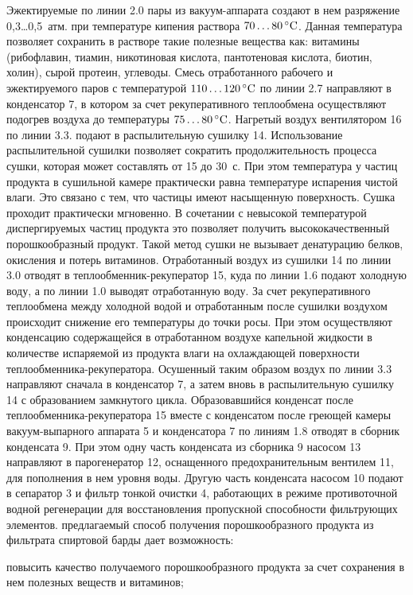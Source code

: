 Эжектируемые по линии 2.0 пары из вакуум-аппарата создают в нем разряжение 0,3\dots0,5~атм. при температуре кипения раствора $70\dots80\,^{\circ}\mathrm{C}$. 
Данная температура позволяет сохранить в растворе такие полезные вещества как: витамины (рибофлавин, тиамин, никотиновая кислота, пантотеновая кислота, биотин, холин), сырой протеин, углеводы. 
Смесь отработанного рабочего и эжектируемого паров с температурой $110\dots120\,^{\circ}\mathrm{C}$ по линии 2.7 направляют в конденсатор 7, в котором за счет рекуперативного теплообмена осуществляют подогрев воздуха до температуры $75\dots80\,^{\circ}\mathrm{C}$. Нагретый воздух вентилятором 16 по линии 3.3. подают в распылительную сушилку 14. 
Использование распылительной сушилки позволяет сократить продолжительность процесса сушки, которая может составлять от 15 до 30~с. 
При этом температура у частиц продукта в сушильной камере практически равна температуре испарения чистой влаги. 
Это связано с тем, что частицы имеют насыщенную поверхность. 
Сушка проходит практически мгновенно. 
В сочетании с невысокой температурой диспергируемых частиц продукта это позволяет получить высококачественный порошкообразный продукт. 
Такой метод сушки не вызывает денатурацию белков, окисления и потерь витаминов. 
Отработанный воздух из сушилки 14 по линии 3.0 отводят в теплообменник-рекуператор 15, куда по линии 1.6 подают холодную воду, а по линии 1.0 выводят отработанную воду.
За счет рекуперативного теплообмена между холодной водой и отработанным после сушилки воздухом происходит снижение его температуры до точки росы. 
При этом осуществляют конденсацию содержащейся в отработанном воздухе капельной жидкости в количестве испаряемой из продукта влаги на охлаждающей поверхности теплообменника-рекуператора. 
Осушенный таким образом воздух по линии 3.3 направляют сначала в конденсатор 7, а затем вновь в распылительную сушилку 14 с образованием замкнутого цикла. 
Образовавшийся конденсат после теплообменника-рекуператора 15 вместе с конденсатом после греющей камеры вакуум-выпарного аппарата 5 и конденсатора 7 по линиям 1.8 отводят в сборник конденсата 9. 
При этом одну часть конденсата из сборника 9 насосом 13 направляют в парогенератор 12, оснащенного предохранительным вентилем 11, для пополнения в нем уровня воды. 
Другую часть конденсата насосом 10 подают в сепаратор 3 и фильтр тонкой очистки 4, работающих в режиме противоточной водной регенерации для восстановления пропускной способности фильтрующих элементов. предлагаемый способ получения порошкообразного продукта из фильтрата спиртовой барды дает возможность:

повысить качество получаемого порошкообразного продукта за счет сохранения в нем полезных веществ и витаминов;

